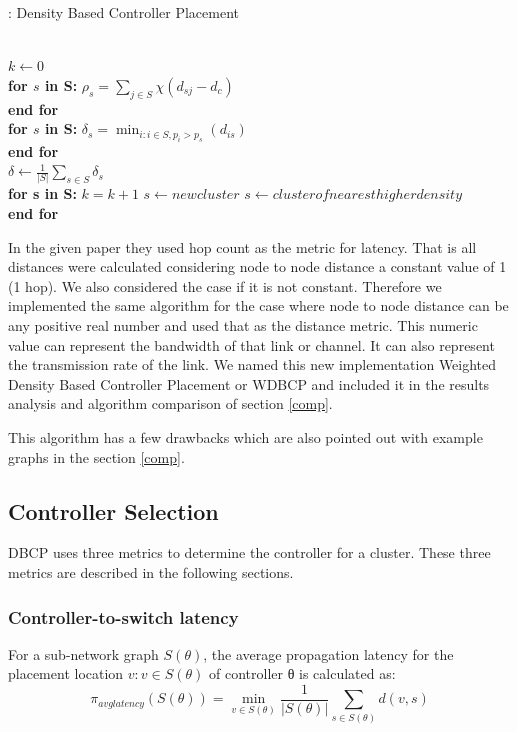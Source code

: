 \documentclass[10pt]{extarticle}
\begin{document}
	\begin{algorithm}
		\caption{: Density Based Controller Placement}\label{euclid}
		\begin{algorithmic}[1]
			 \\
			$k \gets 0$ \\
			\textbf{for $s$ in S:}
			\State $\rho_s=\sum_{j\in S}\chi(d_{sj}-d_c)$ \\
			\textbf{end for} \\
			\textbf{for $s$ in S:}
			\State $\delta_s=\min_{i:i\in S,p_i>p_s}(d_{is})$ \\
			\textbf{end for} \\
			$\delta \gets \frac{1}{|S|}\sum_{s\in S}\delta_s$ \\
			\textbf{for s in S:}
				\State $k = k + 1$
				\State $s \gets newcluster$
			\Else
				\State $s \gets cluster of nearest higher density$
			\EndIf \\
			\textbf{end for}
			\EndProcedure
		\end{algorithmic}
	\end{algorithm}

	In the given paper \cite{dbcp} they used hop count as the metric for latency. That is all distances were calculated considering node to node distance a constant value of 1 (1 hop). We also considered the case if it is not constant. Therefore we implemented the same algorithm for the case where node to node distance can be any positive real number and used that as the distance metric. This numeric value can represent the bandwidth of that link or channel. It can also represent the transmission rate of the link. We named this new implementation Weighted Density Based Controller Placement or WDBCP and included it in the results analysis and algorithm comparison of section \ref{comp}.
	
	This algorithm has a few drawbacks which are also pointed out with example graphs in the section \ref{comp}.

	\subsection{Controller Selection} \label{dbcp:consel}
	DBCP uses three metrics to determine the controller for a cluster. These three metrics are described in the following sections.
	
	\subsubsection{Controller-to-switch latency}
	For a sub-network graph $S(\theta)$, the average propagation latency for the placement location $v:v\in S(\theta)$ of controller θ is calculated as:
	\begin{equation}	\label{pi1}
	\pi_{avglatency}(S(\theta)) = \min_{v\in S(\theta)} \frac{1}{|S(\theta)|} \sum_{s\in S(\theta)}d(v,s)
	\end{equation}
	
\end{document}
